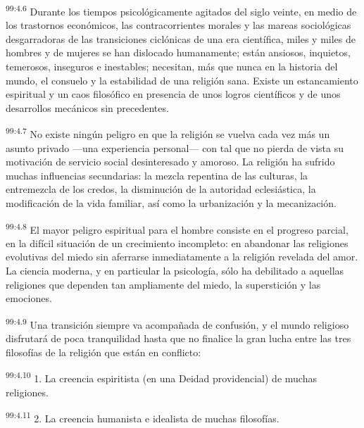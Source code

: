 \documentclass[twoside, 11pt]{book}
\begin{document}
\par
\textsuperscript{99:4.6} Durante los tiempos psicológicamente agitados del siglo veinte, en medio de los trastornos económicos, las contracorrientes morales y las mareas sociológicas desgarradoras de las transiciones ciclónicas de una era científica, miles y miles de hombres y de mujeres se han dislocado humanamente; están ansiosos, inquietos, temerosos, inseguros e inestables; necesitan, más que nunca en la historia del mundo, el consuelo y la estabilidad de una religión sana. Existe un estancamiento espiritual y un caos filosófico en presencia de unos logros científicos y de unos desarrollos mecánicos sin precedentes.

\par
\textsuperscript{99:4.7} No existe ningún peligro en que la religión se vuelva cada vez más un asunto privado ---una experiencia personal--- con tal que no pierda de vista su motivación de servicio social desinteresado y amoroso. La religión ha sufrido muchas influencias secundarias: la mezcla repentina de las culturas, la entremezcla de los credos, la disminución de la autoridad eclesiástica, la modificación de la vida familiar, así como la urbanización y la mecanización.

\par
\textsuperscript{99:4.8} El mayor peligro espiritual para el hombre consiste en el progreso parcial, en la difícil situación de un crecimiento incompleto: en abandonar las religiones evolutivas del miedo sin aferrarse inmediatamente a la religión revelada del amor. La ciencia moderna, y en particular la psicología, sólo ha debilitado a aquellas religiones que dependen tan ampliamente del miedo, la superstición y las emociones.

\par
\textsuperscript{99:4.9} Una transición siempre va acompañada de confusión, y el mundo religioso disfrutará de poca tranquilidad hasta que no finalice la gran lucha entre las tres filosofías de la religión que están en conflicto:

\par
\textsuperscript{99:4.10} 1. La creencia espiritista (en una Deidad providencial) de muchas religiones.

\par
\textsuperscript{99:4.11} 2. La creencia humanista e idealista de muchas filosofías.
\end{document}

